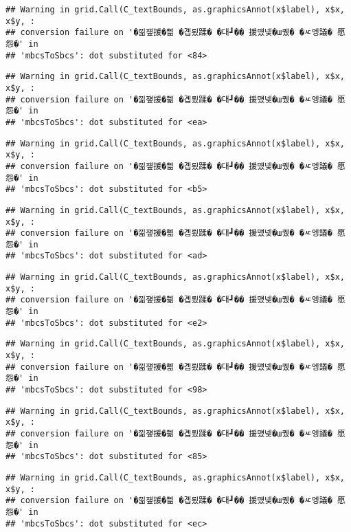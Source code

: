 \documentclass[
]{article}
\begin{document}
\begin{verbatim}
## Warning in grid.Call(C_textBounds, as.graphicsAnnot(x$label), x$x, x$y, :
## conversion failure on '�낆쟾援�쁾 �곕룄蹂� �대┛�� 援먰넻�ш퀬� �ㅼ엥議� 愿怨�' in
## 'mbcsToSbcs': dot substituted for <84>
\end{verbatim}

\begin{verbatim}
## Warning in grid.Call(C_textBounds, as.graphicsAnnot(x$label), x$x, x$y, :
## conversion failure on '�낆쟾援�쁾 �곕룄蹂� �대┛�� 援먰넻�ш퀬� �ㅼ엥議� 愿怨�' in
## 'mbcsToSbcs': dot substituted for <ea>
\end{verbatim}

\begin{verbatim}
## Warning in grid.Call(C_textBounds, as.graphicsAnnot(x$label), x$x, x$y, :
## conversion failure on '�낆쟾援�쁾 �곕룄蹂� �대┛�� 援먰넻�ш퀬� �ㅼ엥議� 愿怨�' in
## 'mbcsToSbcs': dot substituted for <b5>
\end{verbatim}

\begin{verbatim}
## Warning in grid.Call(C_textBounds, as.graphicsAnnot(x$label), x$x, x$y, :
## conversion failure on '�낆쟾援�쁾 �곕룄蹂� �대┛�� 援먰넻�ш퀬� �ㅼ엥議� 愿怨�' in
## 'mbcsToSbcs': dot substituted for <ad>
\end{verbatim}

\begin{verbatim}
## Warning in grid.Call(C_textBounds, as.graphicsAnnot(x$label), x$x, x$y, :
## conversion failure on '�낆쟾援�쁾 �곕룄蹂� �대┛�� 援먰넻�ш퀬� �ㅼ엥議� 愿怨�' in
## 'mbcsToSbcs': dot substituted for <e2>
\end{verbatim}

\begin{verbatim}
## Warning in grid.Call(C_textBounds, as.graphicsAnnot(x$label), x$x, x$y, :
## conversion failure on '�낆쟾援�쁾 �곕룄蹂� �대┛�� 援먰넻�ш퀬� �ㅼ엥議� 愿怨�' in
## 'mbcsToSbcs': dot substituted for <98>
\end{verbatim}

\begin{verbatim}
## Warning in grid.Call(C_textBounds, as.graphicsAnnot(x$label), x$x, x$y, :
## conversion failure on '�낆쟾援�쁾 �곕룄蹂� �대┛�� 援먰넻�ш퀬� �ㅼ엥議� 愿怨�' in
## 'mbcsToSbcs': dot substituted for <85>
\end{verbatim}

\begin{verbatim}
## Warning in grid.Call(C_textBounds, as.graphicsAnnot(x$label), x$x, x$y, :
## conversion failure on '�낆쟾援�쁾 �곕룄蹂� �대┛�� 援먰넻�ш퀬� �ㅼ엥議� 愿怨�' in
## 'mbcsToSbcs': dot substituted for <ec>
\end{verbatim}
\end{document}
